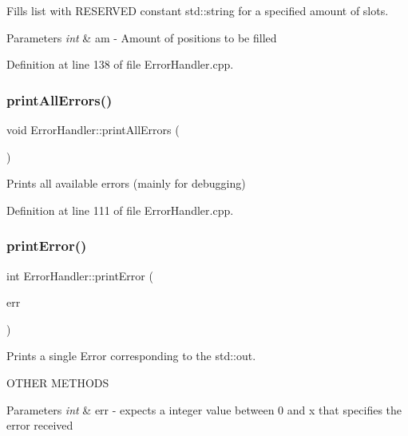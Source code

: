 Fills list with R\+E\+S\+E\+R\+V\+ED constant std\+::string for a specified amount of slots. 


\begin{DoxyParams}{Parameters}
{\em int} & am -\/ Amount of positions to be filled \\
\hline
\end{DoxyParams}


Definition at line 138 of file Error\+Handler.\+cpp.

\mbox{\label{classErrorHandler_a1108324c221544c928a2de3a2cf9ba98}} 
\subsubsection{\texorpdfstring{printAllErrors()}{printAllErrors()}}
{\footnotesize\ttfamily void Error\+Handler\+::print\+All\+Errors (\begin{DoxyParamCaption}\item[{void}]{ }\end{DoxyParamCaption})}



Prints all available errors (mainly for debugging) 



Definition at line 111 of file Error\+Handler.\+cpp.

\mbox{\label{classErrorHandler_ab90b8248f24e3129df69d224585956dd}} 
\subsubsection{\texorpdfstring{printError()}{printError()}\hspace{0.1cm}{\footnotesize\ttfamily [1/2]}}
{\footnotesize\ttfamily int Error\+Handler\+::print\+Error (\begin{DoxyParamCaption}\item[{int}]{err }\end{DoxyParamCaption})}



Prints a single Error corresponding to the std\+::out. 

O\+T\+H\+ER M\+E\+T\+H\+O\+DS
\begin{DoxyParams}{Parameters}
{\em int} & err -\/ expects a integer value between 0 and x that specifies the error received \\
\hline
\end{DoxyParams}


